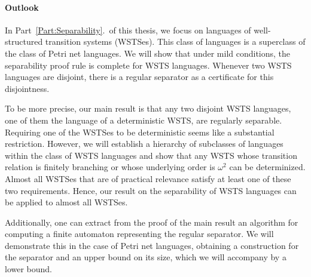 \documentclass[../../diss.tex]{subfiles}
\begin{document}
\paragraph{Outlook}

In Part~\ref{Part:Separability}.~of this thesis, we focus on languages of well-structured transition systems (WSTSes).
This class of languages is a superclass of the class of Petri net languages.
We will show that under mild conditions, the separability proof rule is complete for WSTS languages.
Whenever two WSTS languages are disjoint, there is a regular separator as a certificate for this disjointness.

To be more precise, our main result is that any two disjoint WSTS languages, one of them the language of a deterministic WSTS, are regularly separable.
Requiring one of the WSTSes to be deterministic seems like a substantial restriction.
However, we will establish a hierarchy of subclasses of languages within the class of WSTS languages and show that any WSTS whose transition relation is finitely branching or whose underlying order is $\omega^2$ can be determinized.
Almost all WSTSes that are of practical relevance satisfy at least one of these two requirements.
Hence, our result on the separability of WSTS languages can be applied to almost all WSTSes.

Additionally, one can extract from the proof of the main result an algorithm for computing a finite automaton representing the regular separator.
We will demonstrate this in the case of Petri net languages, obtaining a construction for the separator and an upper bound on its size, which we will accompany by a lower bound.
\end{document}
